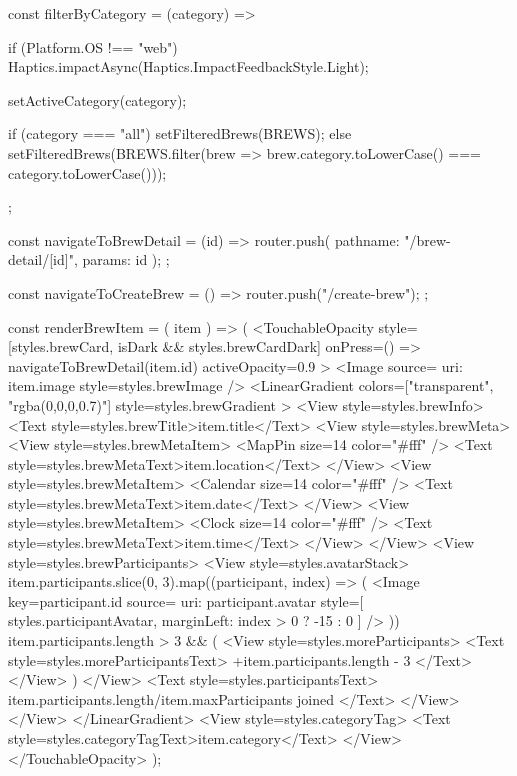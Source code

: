 {  const filterByCategory = (category) => {
    if (Platform.OS !== "web") {
      Haptics.impactAsync(Haptics.ImpactFeedbackStyle.Light);
    }
    
    setActiveCategory(category);
    
    if (category === "all") {
      setFilteredBrews(BREWS);
    } else {
      setFilteredBrews(BREWS.filter(brew => brew.category.toLowerCase() === category.toLowerCase()));
    }
  };
  
  const navigateToBrewDetail = (id) => {
    router.push({
      pathname: "/brew-detail/[id]",
      params: { id }
    });
  };
  
  const navigateToCreateBrew = () => {
    router.push("/create-brew");
  };
  
  const renderBrewItem = ({ item }) => (
    <TouchableOpacity 
      style={[styles.brewCard, isDark && styles.brewCardDark]}
      onPress={() => navigateToBrewDetail(item.id)}
      activeOpacity={0.9}
    >
      <Image source={{ uri: item.image }} style={styles.brewImage} />
      <LinearGradient
        colors={["transparent", "rgba(0,0,0,0.7)"]}
        style={styles.brewGradient}
      >
        <View style={styles.brewInfo}>
          <Text style={styles.brewTitle}>{item.title}</Text>
          <View style={styles.brewMeta}>
            <View style={styles.brewMetaItem}>
              <MapPin size={14} color="#fff" />
              <Text style={styles.brewMetaText}>{item.location}</Text>
            </View>
            <View style={styles.brewMetaItem}>
              <Calendar size={14} color="#fff" />
              <Text style={styles.brewMetaText}>{item.date}</Text>
            </View>
            <View style={styles.brewMetaItem}>
              <Clock size={14} color="#fff" />
              <Text style={styles.brewMetaText}>{item.time}</Text>
            </View>
          </View>
          <View style={styles.brewParticipants}>
            <View style={styles.avatarStack}>
              {item.participants.slice(0, 3).map((participant, index) => (
                <Image 
                  key={participant.id}
                  source={{ uri: participant.avatar }}
                  style={[
                    styles.participantAvatar,
                    { marginLeft: index > 0 ? -15 : 0 }
                  ]}
                />
              ))}
              {item.participants.length > 3 && (
                <View style={styles.moreParticipants}>
                  <Text style={styles.moreParticipantsText}>
                    +{item.participants.length - 3}
                  </Text>
                </View>
              )}
            </View>
            <Text style={styles.participantsText}>
              {item.participants.length}/{item.maxParticipants} joined
            </Text>
          </View>
        </View>
      </LinearGradient>
      <View style={styles.categoryTag}>
        <Text style={styles.categoryTagText}>{item.category}</Text>
      </View>
    </TouchableOpacity>
  );
  
}
